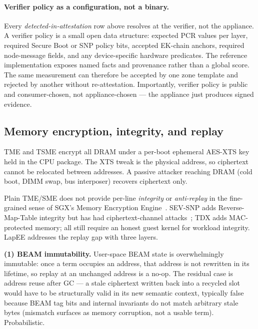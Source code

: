 \documentclass[10pt,a4paper]{article}
\begin{document}
\paragraph{Verifier policy as a configuration, not a binary.} Every
\emph{detected-in-attestation} row above resolves at the verifier, not
the appliance. A verifier policy is a small open data structure: expected
PCR values per layer, required Secure Boot or SNP policy bits, accepted
EK-chain anchors, required node-message fields, and any device-specific
hardware predicates. The reference implementation exposes named facts
and provenance rather than a global score. The same measurement can
therefore be accepted by one zone template and rejected by another
without re-attestation. Importantly, verifier policy is public and
consumer-chosen, not appliance-chosen --- the appliance just produces
signed evidence.

\subsection{Memory encryption, integrity, and replay}
\label{sec:memenc}
\vspace{-0.2em}

TME and TSME encrypt all DRAM under a per-boot ephemeral AES-XTS key held
in the CPU package. The XTS tweak is the physical address, so ciphertext
cannot be relocated between addresses. A passive attacker reaching DRAM
(cold boot, DIMM swap, bus interposer) recovers ciphertext only.

Plain TME/SME does not provide per-line \emph{integrity} or
\emph{anti-replay} in the fine-grained sense of SGX's Memory Encryption
Engine~\cite{costan-sgx}. SEV-SNP adds Reverse-Map-Table integrity but has
had ciphertext-channel attacks~\cite{cipherleaks}; TDX adds MAC-protected
memory; all still require an honest guest kernel for workload integrity.
LapEE addresses the replay gap with three layers.

\textbf{(1) BEAM immutability.} User-space BEAM state is overwhelmingly
immutable: once a term occupies an address, that address is not
rewritten in its lifetime, so replay at an unchanged address is a no-op.
The residual case is address reuse after GC --- a stale ciphertext
written back into a recycled slot would have to be structurally valid
in its new semantic context, typically false because BEAM tag bits and
internal invariants do not match arbitrary stale bytes (mismatch surfaces
as memory corruption, not a usable term). Probabilistic.
\end{document}
